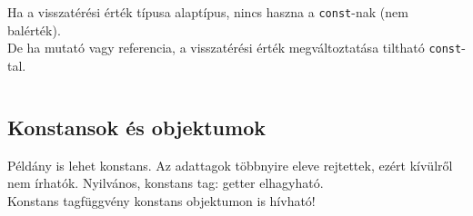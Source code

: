 \begin{frame}
    Ha a visszatérési érték típusa alaptípus, nincs haszna a \texttt{const}-nak (nem balérték). \\
    De ha mutató vagy referencia, a visszatérési érték megváltoztatása tiltható \texttt{const}-tal.
    \begin{columns}[T]
        \begin{column}{0.45\textwidth}
            \begin{exampleblock}{}
                \small
                
            \end{exampleblock}
        \end{column}
        \begin{column}{0.45\textwidth}
            \begin{exampleblock}{}
                \small
                
            \end{exampleblock}
        \end{column}
    \end{columns}
\end{frame}

\begin{frame}
    \begin{exampleblock}{}
        \small
        
        
    \end{exampleblock}
\end{frame}

\subsection{Konstansok és objektumok}

\begin{frame}
    Példány is lehet konstans. Az adattagok többnyire eleve rejtettek, ezért kívülről nem írhatók. Nyilvános, konstans tag: getter elhagyható.\\
    Konstans tagfüggvény konstans objektumon is hívható!
    \begin{exampleblock}{}
        \small
        
    \end{exampleblock}
\end{frame}

